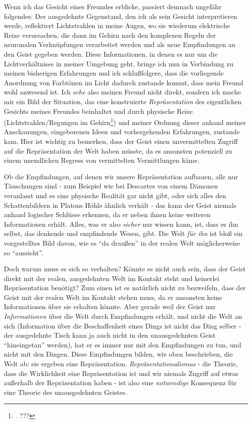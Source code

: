 \documentclass[a4paper, 12pt]{article}
\begin{document}
\begin{onehalfspace}
Wenn ich das Gesicht eines Freundes erblicke, passiert demnach ungefähr folgendes: Der ausgedehnte Gegenstand, den ich als sein Gesicht interpretieren werde, reflektiert Lichtstrahlen in meine Augen, wo sie wiederum elektrische Reize verursachen, die dann im Gehirn nach den komplexen Regeln der neuronalen Verknüpfungen verarbeitet werden und als neue Empfindungen an den Geist gegeben werden. Diese Informationen, in denen es nur um die Lichtverhältnisse in meiner Umgebung geht, bringe ich nun in Verbindung zu meinen bisherigen Erfahrungen und ich schlußfolgere, dass die vorliegende Anordnung von Farbtönen im Licht dadurch zustande kommt, dass mein Freund wohl anwesend ist. Ich \emph{sehe} also meinen Freund nicht direkt, sondern ich mache mir ein Bild der Situation, das eine konstruierte \emph{Repräsentation} des eigentlichen Gesichts meines Freundes beinhaltet und durch physische Reize (Lichtstrahlen/Regungen im Gehirn\footnote{\Cite[Vgl.][S. 270f.]{scheler-idole}. ???}) und meiner Ordnung dieser anhand meiner Anschauungen, eingeborenen Ideen und vorhergehenden Erfahrungen, zustande kam. Hier ist wichtig zu bemerken, dass der Geist einen unvermittelten Zugriff auf die Repräsentation der Welt haben müsste, da es ansonsten potenziell zu einem unendlichen Regress von vermittelten Vermittlungen käme.

Ob die Empfindungen, auf denen wir unsere Repräsentation aufbauen, alle nur Täu\-schungen sind - zum Beispiel wie bei Descartes von einem Dämonen veranlasst und es eine physische Realität gar nicht gibt, oder sich alles den Schattenbildern in Platons Höhle ähnlich verhält - das kann der Geist niemals anhand logischer Schlüsse erkennen, da er neben ihnen keine weiteren Informationen erhält. Alles, was er also \emph{sicher} nur wissen kann, ist, dass es ihn selbst, das denkende und empfindende Wesen, gibt. Die Welt \emph{für ihn} ist bloß ein vorgestelltes Bild davon, wie es "`da draußen"' in der realen Welt möglicherweise so "`aussieht"'.

Doch warum muss es sich so verhalten? Könnte es nicht auch sein, dass der Geist direkt mit der realen, ausgedehnten Welt im Kontakt steht und keinerlei Repräsentation benötigt? Zum einen ist es natürlich nicht zu bezweifeln, dass der Geist mit der realen Welt im Kontakt stehen muss, da er ansonsten keine Informationen über sie erhalten könnte. Aber gerade weil der Geist nur \emph{Informationen} über die Welt durch Empfindungen erhält, und nicht die Welt an sich (Information über die Beschaffenheit eines Dings ist nicht das Ding selber - der ausgedehnte Tisch kann ja auch nicht in den unausgedehnten Geist "`hineingetan"' werden), hat er es immer nur mit den Empfindungen zu tun, und nicht mit den Dingen. Diese Empfindungen bilden, wie oben beschrieben, die Welt ab: sie ergeben eine Repräsentation. \emph{Repräsentationalismus} - die Theorie, dass die Wirklichkeit eine Repräsentation ist und wir niemals Zugriff auf etwas außerhalb der Repräsentation haben - ist also eine \emph{notwendige} Konsequenz für eine Theorie des unausgedehnten Geistes.



\end{onehalfspace}
\end{document}
